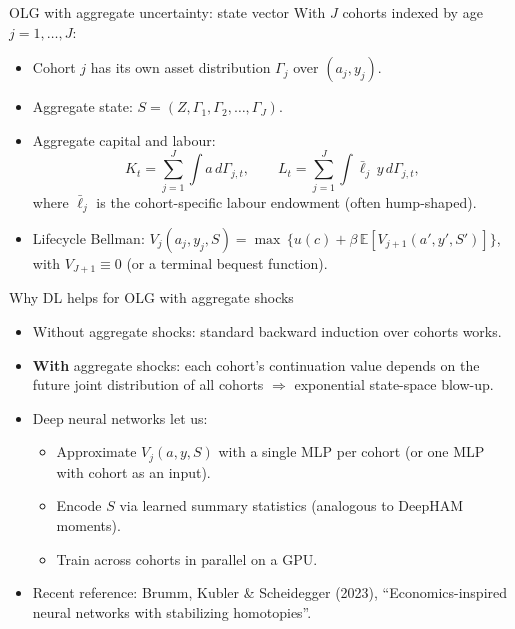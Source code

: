 \documentclass[10pt,english,aspectratio=169]{beamer}
\begin{document}
\begin{frame}{OLG with aggregate uncertainty: state vector}
With $J$ cohorts indexed by age $j = 1, \ldots, J$:
\medskip
\begin{itemize}
\item Cohort $j$ has its own asset distribution $\Gamma_j$ over $(a_j, y_j)$.
\medskip
\item Aggregate state: $S = (Z, \Gamma_1, \Gamma_2, \ldots, \Gamma_J)$.
\medskip
\item Aggregate capital and labour:
\[
K_t = \sum_{j=1}^{J} \int a\,d\Gamma_{j,t}, \qquad
L_t = \sum_{j=1}^{J} \int \bar\ell_j\, y\, d\Gamma_{j,t},
\]
where $\bar\ell_j$ is the cohort-specific labour endowment (often hump-shaped).
\medskip
\item Lifecycle Bellman: $V_j(a_j, y_j, S) = \max\,\{u(c) + \beta\, \mathbb{E}[V_{j+1}(a',y',S')]\}$, with $V_{J+1}\equiv 0$ (or a terminal bequest function).
\end{itemize}
\end{frame}

\begin{frame}{Why DL helps for OLG with aggregate shocks}
\begin{itemize}
\item Without aggregate shocks: standard backward induction over cohorts works.
\medskip
\item \textbf{With} aggregate shocks: each cohort's continuation value depends on the future joint distribution of all cohorts $\Rightarrow$ exponential state-space blow-up.
\medskip
\item Deep neural networks let us:
  \begin{itemize}
  \item Approximate $V_j(a, y, S)$ with a single MLP per cohort (or one MLP with cohort as an input).
  \item Encode $S$ via learned summary statistics (analogous to DeepHAM moments).
  \item Train across cohorts in parallel on a GPU.
  \end{itemize}
\medskip
\item Recent reference: Brumm, Kubler \& Scheidegger (2023), ``Economics-inspired neural networks with stabilizing homotopies''.
\end{itemize}
\end{frame}
\end{document}
